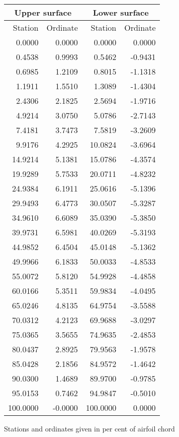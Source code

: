 \documentclass[11pt]{book}
\begin{document}
 \hspace{4mm}
 \begin{tabular}{|r|r|r|r|} \hline 
 \multicolumn{2}{|c|}{Upper surface} & \multicolumn{2}{|c|}{Lower surface} \\
 \hline
 Station & Ordinate & Station & Ordinate \\
 \hline
0.0000 & 0.0000 & 0.0000 & 0.0000 \\
0.4538 & 0.9993 & 0.5462 & -0.9431 \\
0.6985 & 1.2109 & 0.8015 & -1.1318 \\
1.1911 & 1.5510 & 1.3089 & -1.4304 \\
2.4306 & 2.1825 & 2.5694 & -1.9716 \\
4.9214 & 3.0750 & 5.0786 & -2.7143 \\
7.4181 & 3.7473 & 7.5819 & -3.2609 \\
9.9176 & 4.2925 & 10.0824 & -3.6964 \\
14.9214 & 5.1381 & 15.0786 & -4.3574 \\
19.9289 & 5.7533 & 20.0711 & -4.8232 \\
24.9384 & 6.1911 & 25.0616 & -5.1396 \\
29.9493 & 6.4773 & 30.0507 & -5.3287 \\
34.9610 & 6.6089 & 35.0390 & -5.3850 \\
39.9731 & 6.5981 & 40.0269 & -5.3193 \\
44.9852 & 6.4504 & 45.0148 & -5.1362 \\
49.9966 & 6.1833 & 50.0033 & -4.8533 \\
55.0072 & 5.8120 & 54.9928 & -4.4858 \\
60.0166 & 5.3511 & 59.9834 & -4.0495 \\
65.0246 & 4.8135 & 64.9754 & -3.5588 \\
70.0312 & 4.2123 & 69.9688 & -3.0297 \\
75.0365 & 3.5655 & 74.9635 & -2.4853 \\
80.0437 & 2.8925 & 79.9563 & -1.9578 \\
85.0428 & 2.1856 & 84.9572 & -1.4642 \\
90.0300 & 1.4689 & 89.9700 & -0.9785 \\
95.0153 & 0.7462 & 94.9847 & -0.5010 \\
100.0000 & -0.0000 & 100.0000 & 0.0000 \\
 \hline 
 \end{tabular}
 \vspace{8mm}

Stations and ordinates given in per cent of airfoil chord
\end{document}
